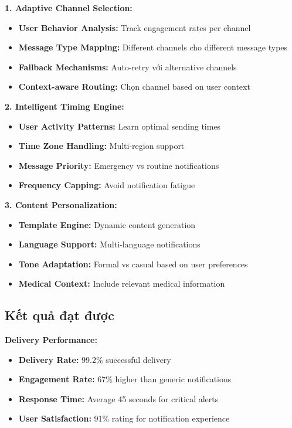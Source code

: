 \documentclass[../DoAn.tex]{subfiles}
\begin{document}
\textbf{1. Adaptive Channel Selection:}
\begin{itemize}
    \item \textbf{User Behavior Analysis:} Track engagement rates per channel
    \item \textbf{Message Type Mapping:} Different channels cho different message types
    \item \textbf{Fallback Mechanisms:} Auto-retry với alternative channels
    \item \textbf{Context-aware Routing:} Chọn channel based on user context
\end{itemize}

\textbf{2. Intelligent Timing Engine:}
\begin{itemize}
    \item \textbf{User Activity Patterns:} Learn optimal sending times
    \item \textbf{Time Zone Handling:} Multi-region support
    \item \textbf{Message Priority:} Emergency vs routine notifications
    \item \textbf{Frequency Capping:} Avoid notification fatigue
\end{itemize}

\textbf{3. Content Personalization:}
\begin{itemize}
    \item \textbf{Template Engine:} Dynamic content generation
    \item \textbf{Language Support:} Multi-language notifications
    \item \textbf{Tone Adaptation:} Formal vs casual based on user preferences
    \item \textbf{Medical Context:} Include relevant medical information
\end{itemize}

\subsection{Kết quả đạt được}

\textbf{Delivery Performance:}
\begin{itemize}
    \item \textbf{Delivery Rate:} 99.2\% successful delivery
    \item \textbf{Engagement Rate:} 67\% higher than generic notifications
    \item \textbf{Response Time:} Average 45 seconds for critical alerts
    \item \textbf{User Satisfaction:} 91\% rating for notification experience
\end{itemize}
\end{document}
